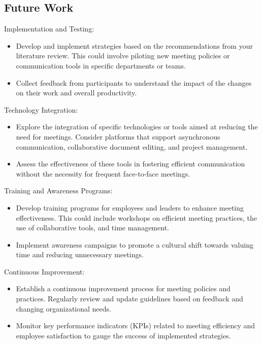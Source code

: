 \subsection{Future Work}
\begin{enumerate}

{\bfseries \item Implementation and Testing:}
\begin{itemize}
  \item Develop and implement strategies based on the recommendations from your literature review. This could involve piloting new meeting policies or communication tools in specific departments or teams.
   \item Collect feedback from participants to understand the impact of the changes on their work and overall productivity.
\end{itemize}
{\bfseries \item Technology Integration:}
\begin{itemize}
   \item Explore the integration of specific technologies or tools aimed at reducing the need for meetings. Consider platforms that support asynchronous communication, collaborative document editing, and project management.
   \item Assess the effectiveness of these tools in fostering efficient communication without the necessity for frequent face-to-face meetings.
\end{itemize}
{\bfseries \item Training and Awareness Programs:}
\begin{itemize}
   \item Develop training programs for employees and leaders to enhance meeting effectiveness. This could include workshops on efficient meeting practices, the use of collaborative tools, and time management.
   \item Implement awareness campaigns to promote a cultural shift towards valuing time and reducing unnecessary meetings.
\end{itemize}
{\bfseries \item Continuous Improvement:}
\begin{itemize}
   \item Establish a continuous improvement process for meeting policies and practices. Regularly review and update guidelines based on feedback and changing organizational needs.
   \item Monitor key performance indicators (KPIs) related to meeting efficiency and employee satisfaction to gauge the success of implemented strategies.

\end{itemize}
\end{enumerate}
